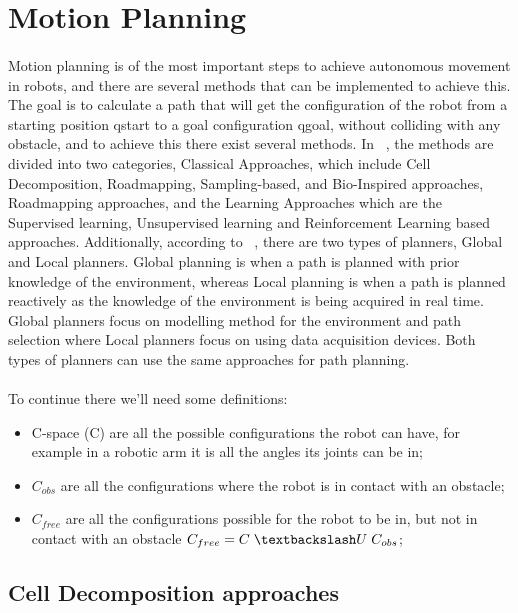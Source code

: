 \section{Motion Planning}
\label{sec:MP}
\paragraph{}Motion planning is of the most important steps to achieve autonomous movement in robots, and there are several methods that can be implemented to achieve this.
The goal is to calculate a path that will get the configuration of the robot from a starting position qstart to a goal configuration qgoal, without colliding 
with any obstacle, and to achieve this there exist several methods.
In ~\cite{tamizi2023review, LIU2023120254}, the methods are divided into two categories, Classical Approaches, which include Cell Decomposition, Roadmapping, Sampling-based, and 
Bio-Inspired approaches, Roadmapping approaches, and the Learning Approaches which are the Supervised learning, Unsupervised learning and Reinforcement Learning based approaches. 
Additionally, according to ~\cite{LIU2023120254}, there are two types of planners, Global and Local planners. Global planning is when a path is planned with prior 
knowledge of the environment, whereas Local planning is when a path is planned reactively as the knowledge of the environment is being acquired in real time. 
Global planners focus on modelling method for the environment and path selection where Local planners focus on using data acquisition devices. 
Both types of planners can use the same approaches for path planning. 
\\
\\
To continue there we'll need some definitions:
\begin{itemize}
   \item C-space (C) are all the possible configurations the robot can have, for example in a robotic arm it is all the angles its joints can be in;
   \item $C_{obs}$ are all the configurations where the robot is in contact with an obstacle;
   \item $C_{free}$ are all the configurations possible for the robot to be in, but not in contact with an obstacle $C_{free}  = C \hspace{0.1cm}\textbackslash U\hspace{0.1cm} C_{obs}$;
\end{itemize}

\subsection{Cell Decomposition approaches}
\label{subsec:CD}
